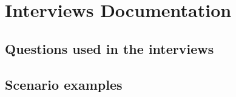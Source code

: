 \chapter{Interviews Documentation}

\section{Questions used in the interviews}

\section{Scenario examples}